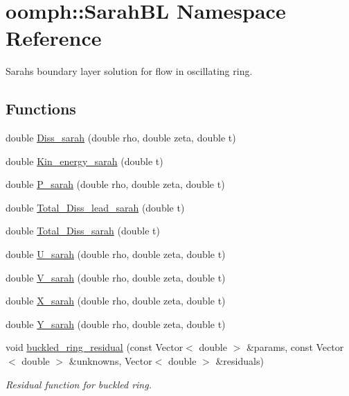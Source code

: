 \hypertarget{namespaceoomph_1_1SarahBL}{}\section{oomph\+:\+:Sarah\+BL Namespace Reference}
\label{namespaceoomph_1_1SarahBL}


Sarah\textquotesingle{}s boundary layer solution for flow in oscillating ring.  


\subsection*{Functions}
\begin{DoxyCompactItemize}
\item 
double \hyperlink{namespaceoomph_1_1SarahBL_a38ddc42a9eb5dee8b355795e28df0e45}{Diss\+\_\+sarah} (double rho, double zeta, double t)
\item 
double \hyperlink{namespaceoomph_1_1SarahBL_a3cb8715d5fa21d7dbff8151e90df4200}{Kin\+\_\+energy\+\_\+sarah} (double t)
\item 
double \hyperlink{namespaceoomph_1_1SarahBL_a8c9f906a629a8eae5eca6346ccf07040}{P\+\_\+sarah} (double rho, double zeta, double t)
\item 
double \hyperlink{namespaceoomph_1_1SarahBL_a8dccddb7ea423d14b6fa8dc9bdb9eca7}{Total\+\_\+\+Diss\+\_\+lead\+\_\+sarah} (double t)
\item 
double \hyperlink{namespaceoomph_1_1SarahBL_abcbefc8bfea90a749dcb6961d9d5c0a0}{Total\+\_\+\+Diss\+\_\+sarah} (double t)
\item 
double \hyperlink{namespaceoomph_1_1SarahBL_a702395898e24e2ff65f724a79b88f63b}{U\+\_\+sarah} (double rho, double zeta, double t)
\item 
double \hyperlink{namespaceoomph_1_1SarahBL_afe2672fb083e5cd566f80d7a0f20df94}{V\+\_\+sarah} (double rho, double zeta, double t)
\item 
double \hyperlink{namespaceoomph_1_1SarahBL_a18945b08e90840028742a9ca2aed94c9}{X\+\_\+sarah} (double rho, double zeta, double t)
\item 
double \hyperlink{namespaceoomph_1_1SarahBL_a95d6eff2fce4d76da4adda6acaea78be}{Y\+\_\+sarah} (double rho, double zeta, double t)
\item 
void \hyperlink{namespaceoomph_1_1SarahBL_a8dadcc240f5e25e9ba10936749678ff6}{buckled\+\_\+ring\+\_\+residual} (const Vector$<$ double $>$ \&params, const Vector$<$ double $>$ \&unknowns, Vector$<$ double $>$ \&residuals)
\begin{DoxyCompactList}\small\item\em Residual function for buckled ring. \end{DoxyCompactList}\item 

\end{DoxyCompactItemize}
